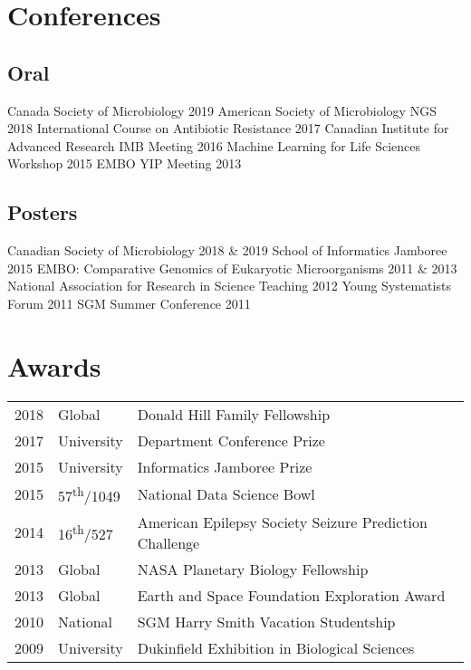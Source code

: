 \documentclass[]{Finlay_Maguire_CV}
\begin{document}
\begin{minipage}[t]{0.66\textwidth}
\section{Conferences}

\subsection{Oral}
    Canada Society of Microbiology 2019 \textbullet{} 
    American Society of Microbiology NGS 2018 \textbullet{} International Course on Antibiotic Resistance 2017 \textbullet{}
    Canadian Institute for Advanced Research IMB Meeting 2016 \textbullet{}
    Machine Learning for Life Sciences Workshop 2015 \textbullet{}
EMBO YIP Meeting 2013\\
\vspace{0.1cm}
\subsection{Posters}
Canadian Society of Microbiology 2018 \& 2019 \textbullet{} School of Informatics Jamboree 2015 \textbullet{} 
    EMBO: Comparative Genomics of Eukaryotic Microorganisms 2011 \& 2013 \textbullet{}
    National Association for Research in Science Teaching 2012 \textbullet{}
    Young Systematists Forum 2011 \textbullet{} SGM Summer Conference 2011 \\

\sectionsep

\vspace{-0.4cm}

\section{Awards} 
\begin{tabular}{rll}
2018         & Global      & Donald Hill Family Fellowship \\
2017         & University  & Department Conference Prize \\
2015	     & University  & Informatics Jamboree Prize \\
2015         & 57\textsuperscript{th}/1049 & National Data Science Bowl\\
2014         & 16\textsuperscript{th}/527 & American Epilepsy Society Seizure Prediction Challenge \\
2013	     & Global & NASA Planetary Biology Fellowship \\
2013	     & Global & Earth and Space Foundation Exploration Award\\
2010     & National & SGM Harry Smith Vacation Studentship\\
2009     & University & Dukinfield Exhibition in Biological Sciences\\
\end{tabular}


\end{minipage}
\end{document}
